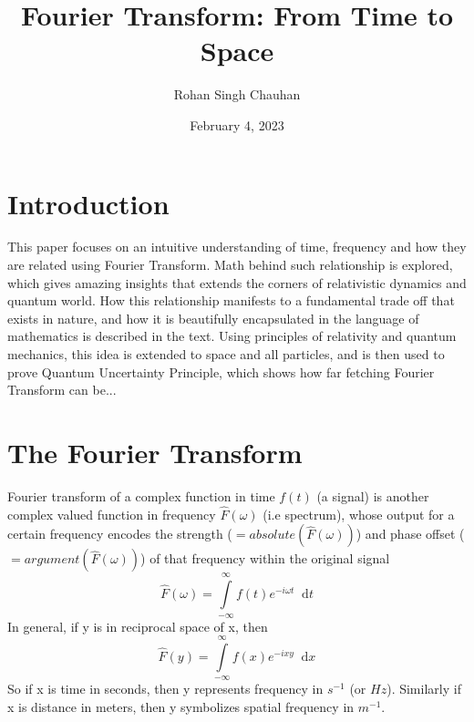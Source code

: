 \documentclass[11pt, a4paper]{article}
\title{Fourier Transform: From Time to Space}
\author{Rohan Singh Chauhan}
\date{February 4, 2023}
\let\oldsection\section
\renewcommand{\section}{%
	\setcounter{equation}{0}%
	\oldsection%
}
\newcommand{\diff}{\mathop{}\!\mathrm{d}}
\newcommand{\dx}{\diff x}
\newcommand{\dt}{\diff t}
\newcommand{\dint}[2]{\int \limits_{#1}^{#2}}  %
\newcommand{\intinfty}{\dint{-\infty}{\infty}}	%
\begin{document}
\maketitle

\section{Introduction}\label{sec:intro}
This paper focuses on an intuitive understanding of time, frequency and how they are related using Fourier Transform. Math behind such relationship is explored, which gives amazing insights that extends the corners of relativistic dynamics and quantum world. How this relationship manifests to a fundamental trade off that exists in nature, and how it is beautifully encapsulated in the language of mathematics is described in the text. Using principles of relativity and quantum mechanics, this idea is extended to space and all particles, and is then used to prove Quantum Uncertainty Principle, which shows how far fetching Fourier Transform can be...

\section{The Fourier Transform}\label{sec:fourier_transform}
Fourier transform of a complex function in time $f(t)$ (a signal) is another complex valued function in frequency $\hat{F}(\omega)$ (i.e spectrum), whose output for a certain frequency encodes the strength ($=absolute(\hat{F}(\omega))$) 
and phase offset ($=argument(\hat{F}(\omega))$) of that frequency within the original signal \cite{herman2016fourieranalysis}
\begin{equation}\label{eq:ft_def}
	\boxed{
		\hat{F}(\omega) = \intinfty f(t)e^{-i\omega t} \dt
	}
\end{equation}
In general, if y is in reciprocal space of x, then
\begin{equation*}\label{eq:ft_def_general}
	\hat{F}(y) = \intinfty f(x)e^{-ixy} \dx
\end{equation*}
So if x is time in seconds, then y represents frequency in $s^{-1}$ (or $Hz$). Similarly if x is distance in meters, then y symbolizes spatial frequency in $m^{-1}$.
\end{document}
